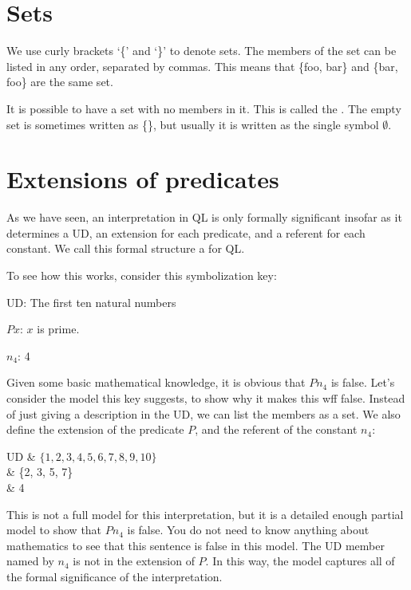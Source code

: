 \section{Sets}

We use curly brackets `\{' and `\}' to denote sets. The members of the set can be listed in any order, separated by commas. This means that \{foo, bar\} and \{bar, foo\} are the same set.

It is possible to have a set with no members in it. This is called the . The empty set is sometimes written as \{\}, but usually it is written as the single symbol $\emptyset$.

\section{Extensions of predicates}
As we have seen, an interpretation in QL is only formally significant insofar as it determines a UD, an extension for each predicate, and a referent for each constant. We call this formal structure a  for QL.

To see how this works, consider this symbolization key:
\begin{ekey}
\item{UD:} The first ten natural numbers
\item{$Px$:} $x$ is prime.
\item{$n_{4}$}: 4
\end{ekey}

Given some basic mathematical knowledge, it is obvious that $Pn_{4}$ is false. Let's consider the model this key suggests, to show why it makes this wff false. Instead of just giving a description in the UD, we can list the members as a set. We also define the extension of the predicate $P$, and the referent of the constant $n_{4}$:

\begin{partialmodel}
	UD & $\{1, 2, 3, 4, 5, 6, 7, 8, 9, 10\}$\\
	 & \{2, 3, 5, 7\}\\
	 & 4
\end{partialmodel}

This is not a full model for this interpretation, but it is a detailed enough partial model to show that $Pn_{4}$ is false. You do not need to know anything about mathematics to see that this sentence is false in this model. The UD member named by $n_{4}$ is not in the extension of $P$. In this way, the model captures all of the formal significance of the interpretation.


